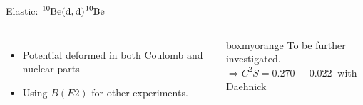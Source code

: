\documentclass[sans,
frameno, %
mp,
usenames,dvipsnames, %
onlytextwidth, %
t,%
11pt]{beamer}
\newcommand{\iso}[2]{\ce{^{#1}#2}}
\begin{document}
\begin{frame}{Elastic: $\iso{10}{Be}(\textrm{d}, \textrm{d})\iso{10}{Be}$}
{\begin{figure}
\begin{minipage}[t]{0.48\linewidth}
            \end{minipage}
        \end{figure}
        \begin{columns}
            {
                \begin{itemize}
                    \item Potential deformed in both Coulomb and nuclear parts
                    \item Using $B(E2)$ for other experiments.
                \end{itemize}
            }\hfill
            {

                \begin{beamercolorbox}[sep=1ex, center, rounded=true]{boxmyorange}
                    To be further investigated. \\
                    $\Rightarrow C^2S = \qty{0.270(22)}{}$ with Daehnick
                \end{beamercolorbox}

            }
        \end{columns}
    }
\end{frame}
\end{document}

